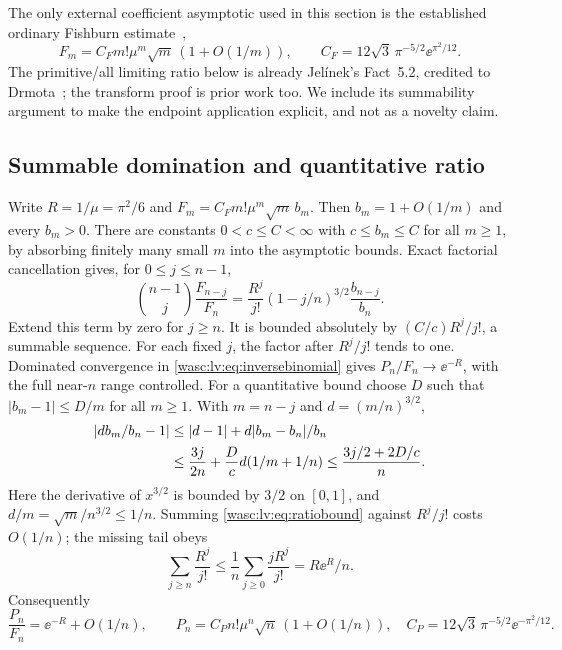 \documentclass[11pt,a4paper]{article}
\theoremstyle{remark}\newtheorem{remark}[theorem]{Remark}
\numberwithin{equation}{section}
\begin{document}
The only external coefficient asymptotic used in this section is the established ordinary Fishburn estimate~\cite{jelinek,hwang},
\begin{equation}\label{wasc:lv:eq:fishburn}
F_m=C_Fm!\mu^m\sqrt m\,(1+O(1/m)),\qquad
C_F=12\sqrt3\,\pi^{-5/2}\ee^{\pi^2/12}.
\end{equation}
The primitive/all limiting ratio below is already Jel\'inek's Fact~5.2, credited to Drmota~\cite{jelinek}; the transform proof is prior work too. We include its summability argument to make the endpoint application explicit, and not as a novelty claim.

\subsection{Summable domination and quantitative ratio}
Write $R=1/\mu=\pi^2/6$ and
$F_m=C_Fm!\mu^m\sqrt m\,b_m$. Then $b_m=1+O(1/m)$ and every $b_m>0$.
There are constants $0<c\le C<\infty$ with $c\le b_m\le C$ for all $m\ge1$, by absorbing finitely many small $m$ into the asymptotic bounds.
Exact factorial cancellation gives, for $0\le j\le n-1$,
\begin{equation}\label{wasc:lv:eq:domterm}
\binom{n-1}{j}\frac{F_{n-j}}{F_n}
=\frac{R^j}{j!}(1-j/n)^{3/2}\frac{b_{n-j}}{b_n}.
\end{equation}
Extend this term by zero for $j\ge n$. It is bounded absolutely by $(C/c)R^j/j!$, a summable sequence. For each fixed $j$, the factor after $R^j/j!$ tends to one. Dominated convergence in \eqref{wasc:lv:eq:inversebinomial} gives $P_n/F_n\to\ee^{-R}$, with the full near-$n$ range controlled.
For a quantitative bound choose $D$ such that $|b_m-1|\le D/m$ for all $m\ge1$.
With $m=n-j$ and $d=(m/n)^{3/2}$,
\begin{align}\label{wasc:lv:eq:ratiobound}
|d b_m/b_n-1|
&\le|d-1|+d|b_m-b_n|/b_n\notag\\
&\le\frac{3j}{2n}+\frac Dc d(1/m+1/n)
\le\frac{3j/2+2D/c}{n}.
\end{align}
Here the derivative of $x^{3/2}$ is bounded by $3/2$ on $[0,1]$, and
$d/m=\sqrt m/n^{3/2}\le1/n$. Summing \eqref{wasc:lv:eq:ratiobound} against $R^j/j!$ costs $O(1/n)$; the missing tail obeys
\[
\sum_{j\ge n}\frac{R^j}{j!}\le\frac1n\sum_{j\ge0}\frac{jR^j}{j!}
=R\ee^R/n.
\]
Consequently
\begin{equation}\label{wasc:lv:eq:primitiveratio}
\frac{P_n}{F_n}=\ee^{-R}+O(1/n),\qquad
P_n=C_Pn!\mu^n\sqrt n\,(1+O(1/n)),\quad
C_P=12\sqrt3\,\pi^{-5/2}\ee^{-\pi^2/12}.
\end{equation}
\end{document}
